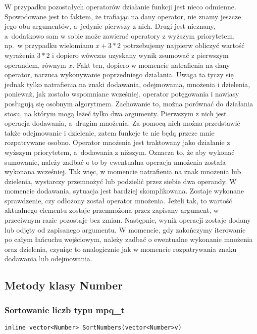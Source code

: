 W przypadku pozostałych operatorów działanie funkcji jest nieco odmienne. Spowodowane jest to faktem, że trafiając na dany operator, nie znamy jeszcze jego obu argumentów, a~jedynie pierwszy z nich. Drugi jest nieznany, a~dodatkowo sam w sobie może zawierać operatory z wyższym priorytetem, np.\ w przypadku wielomianu $x+3*2$ potrzebujemy najpierw obliczyć wartość wyrażenia $3*2$ i dopiero wówczas uzyskany wynik zsumować z pierwszym operandem, równym $x$. Fakt ten, dopiero w momencie natrafienia na dany operator, narzuca wykonywanie poprzedniego działania. Uwaga ta tyczy się jednak tylko natrafienia na znaki dodawania, odejmowania, mnożenia i dzielenia, ponieważ, jak zostało wspomniane wcześniej, operator potęgowania i nawiasy posługują się osobnym algorytmem. Zachowanie to, można porównać do działania stosu, na którym mogą leżeć tylko dwa argumenty. Pierwszym z nich jest operacja dodawania, a~drugim mnożenia. Za pomocą nich można przedstawić także odejmowanie i dzielenie, zatem funkcje te nie będą przeze mnie rozpatrywane osobno. Operator mnożenia jest traktowany jako działanie z wyższym priorytetem, a~dodawania z niższym. Oznacza to, że aby wykonać sumowanie, należy zadbać o to by ewentualna operacja mnożenia została wykonana wcześniej. Tak więc, w momencie natrafienia na znak mnożenia lub dzielenia, wystarczy przemnożyć lub podzielić przez siebie dwa operandy. W momencie dodawania, sytuacja jest bardziej skomplikowana. Zostaje wykonane sprawdzenie, czy odłożony został operator mnożenia. Jeżeli tak, to wartość aktualnego elementu zostaje przemnożona przez zapisany argument, w przeciwnym razie pozostaje bez zmian. Następnie, wynik operacji zostaje dodany lub odjęty od zapisanego argumentu. W momencie, gdy zakończymy iterowanie po całym łańcuchu wejściowym, należy zadbać o ewentualne wykonanie mnożenia oraz dzielenia, czyniąc to analogicznie jak w momencie rozpatrywania znaku dodawania lub odejmowania.

\subsection{Metody klasy Number}

\subsubsection{Sortowanie liczb typu mpq\_t}
\begin{lstlisting}
inline vector<Number> SortNumbers(vector<Number>v)
\end{lstlisting}

